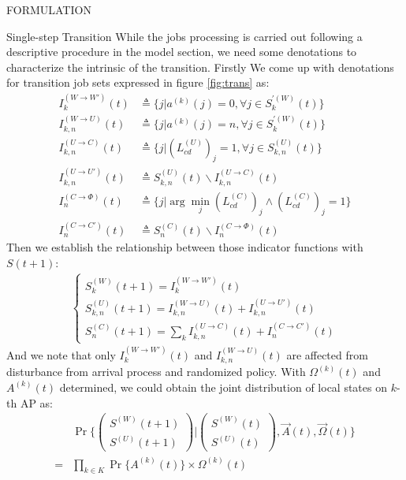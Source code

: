\documentclass[10pt, conference, letterpaper]{IEEEtran}
\begin{document}
\begin{section}{FORMULATION}
\begin{subsection}{Single-step Transition}
            While the jobs processing is carried out following a descriptive procedure in the model section, we need some denotations to characterize the intrinsic of the transition. Firstly We come up with denotations for transition job sets expressed in figure \ref{fig:trans} as:
            \begin{align}
                I^{(W \to W')}_{k}(t) & \triangleq \{ j | a^{(k)}(j)=0, \forall j \in S^{'(W)}_k(t)\}
                \\
                I^{(W \to U)}_{k,n}(t) &\triangleq \{ j | a^{(k)}(j)=n, \forall j \in S^{'(W)}_k(t)\}
                \\
                I^{(U \to C)}_{k,n}(t) &\triangleq \{j|(L^{(U)}_{cd})_j=1, \forall j \in S^{(U)}_{k,n}(t)\}
                \\
                I^{(U \to U')}_{k,n}(t) &\triangleq S^{(U)}_{k,n}(t) \backslash I^{(U \to C)}_{k,n}(t)
                \\
                I^{(C \to \Phi)}_{n}(t) &\triangleq \{j|\arg\min_{j} (L^{(C)}_{cd})_j \wedge (L^{(C)}_{cd})_j=1\}
                \\
                I^{(C \to C')}_{n}(t) &\triangleq S^{(C)}_{n}(t) \backslash I^{(C \to \Phi)}_{n}(t)
            \end{align}
            Then we establish the relationship between those indicator functions with $S(t+1)$:
            \begin{align}
                \begin{cases}
                    S^{(W)}_{k}(t+1) = I^{(W \to W')}_{k}(t)
                    \\
                    S^{(U)}_{k,n}(t+1) = I^{(W \to U)}_{k,n}(t) + I^{(U \to U')}_{k,n}(t)
                    \\
                    S^{(C)}_{n}(t+1) = \sum_k I^{(U \to C)}_{k,n}(t) + I^{(C \to C')}_{n}(t)
                \end{cases}
            \end{align}
            And we note that only $I^{(W \to W')}_{k}(t)$ and $I^{(W \to U)}_{k,n}(t)$ are affected from disturbance from arrival process and randomized policy. With $\Omega^{(k)}(t)$ and $A^{(k)}(t)$ determined, we could obtain the joint distribution of local states on $k$-th AP as:
            \begin{align}
                & \Pr\{\begin{pmatrix}
                    S^{(W)}(t+1) \\ S^{(U)}(t+1)
                \end{pmatrix}
                |
                \begin{pmatrix}
                    S^{(W)}(t) \\ S^{(U)}(t)
                \end{pmatrix}, \vec{A}(t), \vec{\Omega}(t)
                \}
                \nonumber\\
                = &\prod_{k \in K} \Pr\{ A^{(k)}(t) \} \times \Omega^{(k)}(t)
            \end{align}


\end{subsection}
\end{section}
\end{document}
